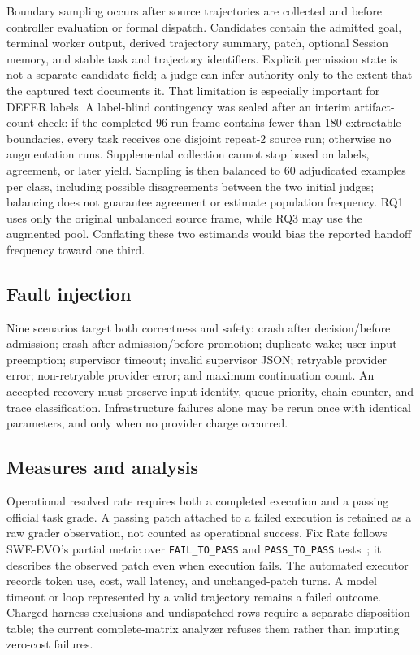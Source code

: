 \documentclass[sigconf,nonacm]{acmart}
\begin{document}
Boundary sampling occurs after source trajectories are collected and before controller evaluation or formal dispatch. Candidates contain the admitted goal, terminal worker output, derived trajectory summary, patch, optional Session memory, and stable task and trajectory identifiers. Explicit permission state is not a separate candidate field; a judge can infer authority only to the extent that the captured text documents it. That limitation is especially important for DEFER labels. A label-blind contingency was sealed after an interim artifact-count check: if the completed 96-run frame contains fewer than 180 extractable boundaries, every task receives one disjoint repeat-2 source run; otherwise no augmentation runs. Supplemental collection cannot stop based on labels, agreement, or later yield. Sampling is then balanced to 60 adjudicated examples per class, including possible disagreements between the two initial judges; balancing does not guarantee agreement or estimate population frequency. RQ1 uses only the original unbalanced source frame, while RQ3 may use the augmented pool. Conflating these two estimands would bias the reported handoff frequency toward one third.

\subsection{Fault injection}

Nine scenarios target both correctness and safety: crash after decision/before admission; crash after admission/before promotion; duplicate wake; user input preemption; supervisor timeout; invalid supervisor JSON; retryable provider error; non-retryable provider error; and maximum continuation count. An accepted recovery must preserve input identity, queue priority, chain counter, and trace classification. Infrastructure failures alone may be rerun once with identical parameters, and only when no provider charge occurred.

\subsection{Measures and analysis}

Operational resolved rate requires both a completed execution and a passing official task grade. A passing patch attached to a failed execution is retained as a raw grader observation, not counted as operational success. Fix Rate follows SWE-EVO's partial metric over \texttt{FAIL\_TO\_PASS} and \texttt{PASS\_TO\_PASS} tests~\cite{le2025sweevo}; it describes the observed patch even when execution fails. The automated executor records token use, cost, wall latency, and unchanged-patch turns. A model timeout or loop represented by a valid trajectory remains a failed outcome. Charged harness exclusions and undispatched rows require a separate disposition table; the current complete-matrix analyzer refuses them rather than imputing zero-cost failures.
\end{document}
